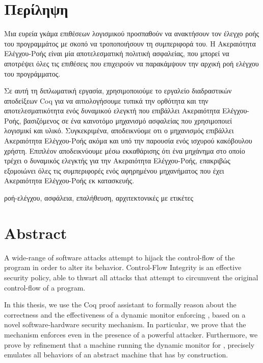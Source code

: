 \chapter*{Περίληψη}
\label{absgr}
  Μια ευρεία γκάμα επιθέσεων λογισμικού προσπαθούν να ανακτήσουν τον
  έλεγχο ροής του προγραμμάτος με σκοπό να τροποποιήσουν τη
  συμπεριφορά του. Η Ακεραιότητα Ελέγχου-Ροής είναι μία αποτελεσματική
  πολιτική ασφαλείας, που μπορεί να αποτρέψει όλες τις επιθέσεις που
  επιχειρούν να παρακάμψουν την αρχική ροή ελέγχου του προγράμματος. 

  Σε αυτή τη διπλωματική εργασία, χρησιμοποιούμε το εργαλείο
  διαδραστικών αποδείξεων Coq για να αιτιολογήσουμε τυπικά την
  ορθότητα και την αποτελεσματικότητα ενός δυναμικού ελεγκτή που
  επιβάλλει Ακεραιότητα Ελέγχου-Ροής, βασιζόμενος σε ένα καινοτόμο
  μηχανισμό ασφαλείας που χρησιμοποιεί λογισμικί και υλικό.
  Συγκεκριμένα, αποδεικνύομε οτι ο μηχανισμός επιβάλλει Ακεραιότητα
  Ελέγχου-Ροής ακόμα και υπό την παρουσία ενός ισχυρού κακόβουλου
  χρήστη. Επιπλέον αποδεικνύουμε μέσω εκκαθάρισης ότι ένα μηχάνημα στο
  οποίο τρέχει ο δυναμικός ελεγκτής για την Ακεραιότητα Ελέγχου-Ροής,
  επακριβώς εξομοιώνει όλες τις συμπεριφορές ενός αφηρημένου
  μηχανήματος που έχει Ακεραιότητα Ελέγχου-Ροής εκ κατασκευής.

\begin{keywords}
ροή-ελέγχου, ασφάλεια, επαλήθευση, αρχιτεκτονικές με ετικέτες
\end{keywords}


\chapter*{Abstract}
\label{Abstract}

  A wide-range of software attacks attempt to hijack the control-flow
  of the program in order to alter its behavior. Control-Flow
  Integrity is an effective security policy, able to thwart all
  attacks that attempt to circumvent the original control-flow of a
  program.

  In this thesis, we use the Coq proof assistant to formally reason
  about the correctness and the effectiveness of a dynamic monitor
  enforcing \CFI, based on a novel software-hardware security
  mechanism. In particular, we prove that the mechanism enforces \CFI
  even in the presence of a powerful attacker. Furthermore, we prove
  by refinement that a machine running the dynamic monitor for \CFI,
  precisely emulates all behaviors of an abstract machine that has
  \CFI by construction.

